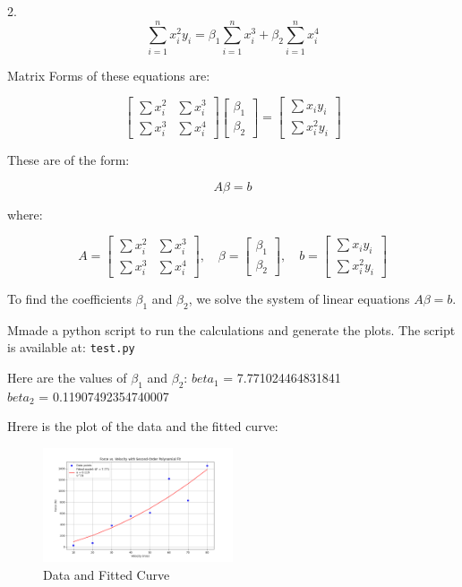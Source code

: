 \documentclass[12pt]{article}
\begin{document}
2. \[
\sum_{i=1}^n x_i^2 y_i = \beta_1 \sum_{i=1}^n x_i^3 + \beta_2 \sum_{i=1}^n x_i^4
\]

Matrix Forms of these equations are:

\[
\begin{bmatrix}
\sum x_i^2 & \sum x_i^3 \\
\sum x_i^3 & \sum x_i^4
\end{bmatrix}
\begin{bmatrix}
\beta_1 \\
\beta_2
\end{bmatrix}
=
\begin{bmatrix}
\sum x_i y_i \\
\sum x_i^2 y_i
\end{bmatrix}
\]

These are of the form:

\[
A \beta = b
\]

where:

\[
A = \begin{bmatrix}
\sum x_i^2 & \sum x_i^3 \\
\sum x_i^3 & \sum x_i^4
\end{bmatrix},
\quad
\beta = \begin{bmatrix}
\beta_1 \\
\beta_2
\end{bmatrix},
\quad
b = \begin{bmatrix}
\sum x_i y_i \\
\sum x_i^2 y_i
\end{bmatrix}
\]

To find the coefficients \(\beta_1\) and \(\beta_2\), we solve the system of linear equations \( A \beta = b \).

Mmade a python script to run the calculations and generate the plots. The script is available at: \texttt{test.py}

Here are the values of \(\beta_1\) and \(\beta_2\):
\(beta_1\) = 7.771024464831841\\
\(beta_2\) = 0.11907492354740007

Hrere is the plot of the data and the fitted curve:

\begin{figure}[h]
    \centering
    \includegraphics[width=0.5\textwidth]{../force_vs_velocity_fit.png}
    \caption{Data and Fitted Curve}
\end{figure}
\end{document}
